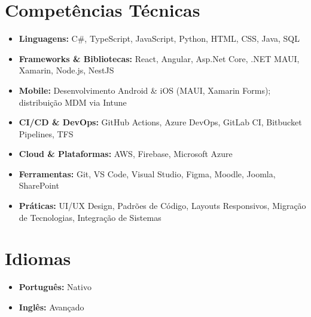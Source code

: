 \documentclass[a4paper,10pt]{article}
\begin{document}
\section*{Competências Técnicas}

\begin{itemize}[leftmargin=1cm]
    \item \textbf{Linguagens:} C\#, TypeScript, JavaScript, Python, HTML, CSS, Java, SQL
    \item \textbf{Frameworks \& Bibliotecas:} React, Angular, Asp.Net Core, .NET MAUI, Xamarin, Node.js, NestJS
    \item \textbf{Mobile:} Desenvolvimento Android \& iOS (MAUI, Xamarin Forms); distribuição MDM via Intune
    \item \textbf{CI/CD \& DevOps:} GitHub Actions, Azure DevOps, GitLab CI, Bitbucket Pipelines, TFS
    \item \textbf{Cloud \& Plataformas:} AWS, Firebase, Microsoft Azure
    \item \textbf{Ferramentas:} Git, VS Code, Visual Studio, Figma, Moodle, Joomla, SharePoint
    \item \textbf{Práticas:} UI/UX Design, Padrões de Código, Layouts Responsivos, Migração de Tecnologias, Integração de Sistemas
\end{itemize}

\section*{Idiomas}
\begin{itemize}[leftmargin=1cm]
    \item \textbf{Português:} Nativo
    \item \textbf{Inglês:} Avançado
\end{itemize}
\end{document}
